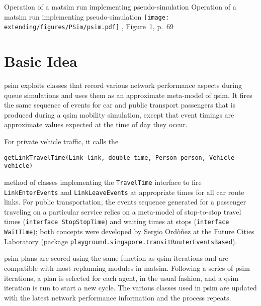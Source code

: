\createfigure%
{Operation of a \protect\gls{matsim} run implementing pseudo-simulation}%
{Operation of a \protect\gls{matsim} run implementing pseudo-simulation}%
{\label{fig:PSim}}%
{\texttt{[image: extending/figures/PSim/psim.pdf]}}%
{\citet[][]{FourieEtAl_TRR_2013}, Figure~1, p.~69}

\section{Basic Idea}
\gls{psim} exploits classes that record various network performance aspects during queue simulations and uses them as an approximate meta-model of \gls{qsim}. It fires the same sequence of events for car and public transport passengers that is produced during a \gls{qsim} mobility simulation, except that event timings are approximate values expected at the time of day they occur.

For private vehicle traffic, it calls the 
\begin{lstlisting}
getLinkTravelTime(Link link, double time, Person person, Vehicle vehicle)
\end{lstlisting}
method of classes implementing the \lstinline|TravelTime| interface to fire \lstinline|LinkEnterEvents| and \lstinline|LinkLeaveEvents| at appropriate times for all car route links. For public transportation, the events sequence generated for a passenger traveling on a particular service relies on a meta-model of stop-to-stop travel times (\lstinline|interface StopStopTime|) and waiting times at stops (\lstinline|interface WaitTime|); both concepts were developed by Sergio Ord\`o\~nez at the Future Cities Laboratory (package \lstinline|playground.singapore.transitRouterEventsBased|).

\gls{psim} plans are scored using the same function as  \gls{qsim} iterations and are compatible with most replanning modules in \gls{matsim}. Following a series of \gls{psim} iterations, a plan is selected for each agent, in the usual fashion, and a \gls{qsim} iteration is run to start a new cycle. The various classes used in \gls{psim} are updated with the latest network performance information and the process repeats.

